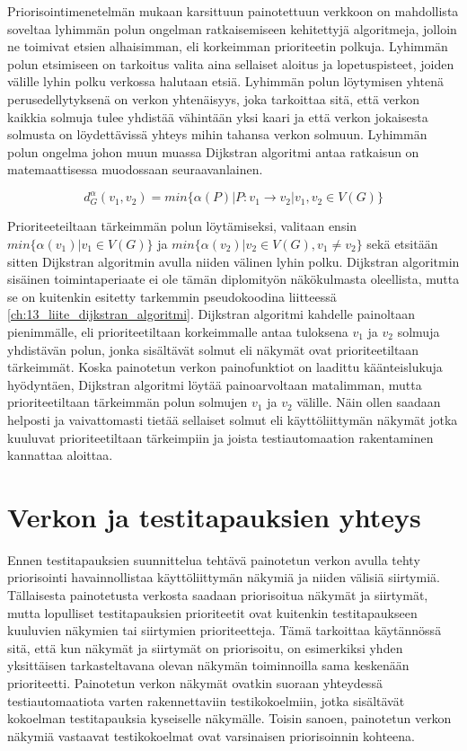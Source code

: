   Priorisointimenetelmän mukaan karsittuun painotettuun verkkoon on mahdollista soveltaa lyhimmän polun ongelman ratkaisemiseen kehitettyjä algoritmeja, jolloin ne toimivat etsien alhaisimman, eli korkeimman prioriteetin polkuja.
  Lyhimmän polun etsimiseen on tarkoitus valita aina sellaiset aloitus ja lopetuspisteet, joiden välille lyhin polku verkossa halutaan etsiä.
  Lyhimmän polun löytymisen yhtenä perusedellytyksenä on verkon yhtenäisyys, joka tarkoittaa sitä, että verkon kaikkia solmuja tulee yhdistää vähintään yksi kaari ja että verkon jokaisesta solmusta on löydettävissä yhteys mihin tahansa verkon solmuun.
  Lyhimmän polun ongelma johon muun muassa Dijkstran algoritmi antaa ratkaisun on matemaattisessa muodossaan seuraavanlainen.

  \[d_G^\alpha(v_1, v_2) = min\{\alpha(P) | P:v_1 \rightarrow v_2 | v_1, v_2 \in V(G)\}\]

  Prioriteeteiltaan tärkeimmän polun löytämiseksi, valitaan ensin \(min\{\alpha(v_1) | v_1 \in V(G)\}\) ja \(min\{\alpha(v_2) | v_2 \in V(G), v_1 \neq v_2\}\) sekä etsitään sitten Dijkstran algoritmin avulla niiden välinen lyhin polku.
  Dijkstran algoritmin sisäinen toimintaperiaate ei ole tämän diplomityön näkökulmasta oleellista, mutta se on kuitenkin esitetty tarkemmin pseudokoodina liitteessä \ref{ch:13_liite_dijkstran_algoritmi}.
  Dijkstran algoritmi kahdelle painoltaan pienimmälle, eli prioriteetiltaan korkeimmalle antaa tuloksena \(v_1\) ja \(v_2\) solmuja yhdistävän polun, jonka sisältävät solmut eli näkymät ovat prioriteetiltaan tärkeimmät.
  Koska painotetun verkon painofunktiot on laadittu käänteislukuja hyödyntäen, Dijkstran algoritmi löytää painoarvoltaan matalimman, mutta prioriteetiltaan tärkeimmän polun solmujen \(v_1\) ja \(v_2\) välille.
  Näin ollen saadaan helposti ja vaivattomasti tietää sellaiset solmut eli käyttöliittymän näkymät jotka kuuluvat prioriteetiltaan tärkeimpiin ja joista testiautomaation rakentaminen kannattaa aloittaa.

\section{Verkon ja testitapauksien yhteys} \label{ch:10_verkon_ja_testitapauksien_yhteys}

  Ennen testitapauksien suunnittelua tehtävä painotetun verkon avulla tehty priorisointi havainnollistaa käyttöliittymän näkymiä ja niiden välisiä siirtymiä.
  Tällaisesta painotetusta verkosta saadaan priorisoitua näkymät ja siirtymät, mutta lopulliset testitapauksien prioriteetit ovat kuitenkin testitapaukseen kuuluvien näkymien tai siirtymien prioriteetteja.
  Tämä tarkoittaa käytännössä sitä, että kun näkymät ja siirtymät on priorisoitu, on esimerkiksi yhden yksittäisen tarkasteltavana olevan näkymän toiminnoilla sama keskenään prioriteetti.
  Painotetun verkon näkymät ovatkin suoraan yhteydessä testiautomaatiota varten rakennettaviin testikokoelmiin, jotka sisältävät kokoelman testitapauksia kyseiselle näkymälle.
  Toisin sanoen, painotetun verkon näkymiä vastaavat testikokoelmat ovat varsinaisen priorisoinnin kohteena.

